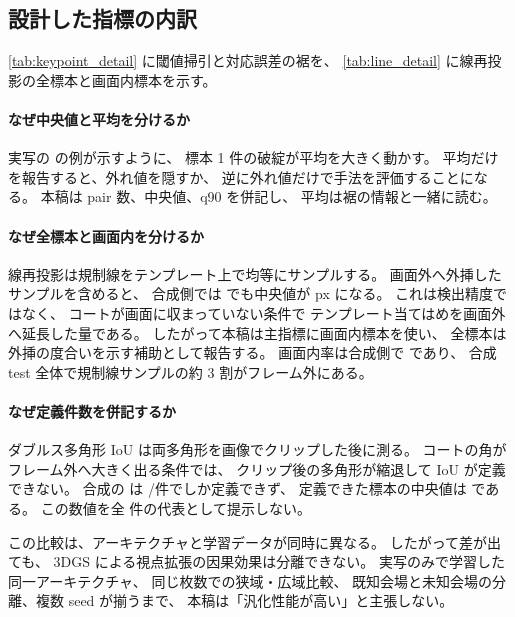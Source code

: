 \subsection{設計した指標の内訳}
\label{sec:results_metrics}

\cref{tab:keypoint_detail} に閾値掃引と対応誤差の裾を、
\cref{tab:line_detail} に線再投影の全標本と画面内標本を示す。



\paragraph{なぜ中央値と平均を分けるか}
実写の \BaselineShort の例が示すように、
標本 1 件の破綻が平均を大きく動かす。
平均だけを報告すると、外れ値を隠すか、
逆に外れ値だけで手法を評価することになる。
本稿は pair 数、中央値、q90 を併記し、
平均は裾の情報と一緒に読む。

\paragraph{なぜ全標本と画面内を分けるか}
線再投影は規制線をテンプレート上で均等にサンプルする。
画面外へ外挿したサンプルを含めると、
合成側では \Method でも中央値が \resSynthOursLineMedian px になる。
これは検出精度ではなく、
コートが画面に収まっていない条件で
テンプレート当てはめを画面外へ延長した量である。
したがって本稿は主指標に画面内標本を使い、
全標本は外挿の度合いを示す補助として報告する。
画面内率は合成側で \resSynthOursLineInFraction であり、
合成 test 全体で規制線サンプルの約 3 割がフレーム外にある。

\paragraph{なぜ定義件数を併記するか}
ダブルス多角形 IoU は両多角形を画像でクリップした後に測る。
コートの角がフレーム外へ大きく出る条件では、
クリップ後の多角形が縮退して IoU が定義できない。
合成の \Method は \resSynthOursIouDefined/\resSynthOursIouTotal 件でしか定義できず、
定義できた標本の中央値は \resSynthOursIouMedian である。
この数値を全 \resSynthOursIouTotal 件の代表として提示しない。



この比較は、アーキテクチャと学習データが同時に異なる。
したがって差が出ても、
3DGS による視点拡張の因果効果は分離できない。
実写のみで学習した同一アーキテクチャ、
同じ枚数での狭域・広域比較、
既知会場と未知会場の分離、複数 seed が揃うまで、
本稿は「汎化性能が高い」と主張しない。

